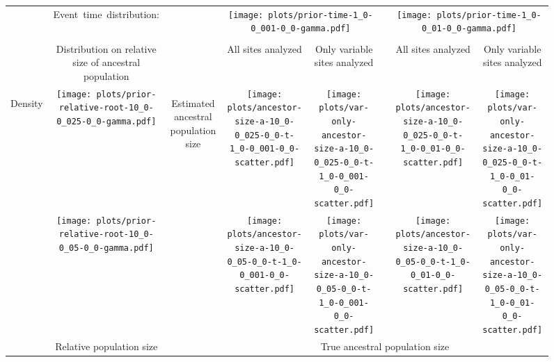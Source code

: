 \documentclass[border=10pt,varwidth=30cm]{standalone}
\begin{document}
\begin{figure}
    \centering
    \begin{tabular}{@{}cccccccc@{}}
        & \multirow{1}{0.15\textwidth}[8em]{\centering\Large Event~time~distribution:}
        &
        & \multicolumn{2}{c}{\texttt{[image: plots/prior-time-1\_0-0\_001-0\_0-gamma.pdf]}}
        &
        & \multicolumn{2}{c}{\texttt{[image: plots/prior-time-1\_0-0\_01-0\_0-gamma.pdf]}} \\
        \cline{1-2}\cline{4-5}\cline{7-8}
        & & & & & & & \\
        & \multirow{1}{0.15\textwidth}{\centering\Large Distribution on relative size of ancestral population}
        &
        & \multirow{1}{0.15\textwidth}{\centering\Large All sites analyzed}
        & \multirow{1}{0.15\textwidth}{\centering\Large Only variable sites analyzed}
        &
        & \multirow{1}{0.15\textwidth}{\centering\Large All sites analyzed}
        & \multirow{1}{0.15\textwidth}{\centering\Large Only variable sites analyzed} \\[9ex]
        \multirow{2}{*}[1em]{\begin{sideways}\large Density\end{sideways}}
        & \texttt{[image: plots/prior-relative-root-10\_0-0\_025-0\_0-gamma.pdf]}
        & \multirow{2}{*}[8em]{\begin{sideways}\large Estimated ancestral population size\end{sideways}}
        & \texttt{[image: plots/ancestor-size-a-10\_0-0\_025-0\_0-t-1\_0-0\_001-0\_0-scatter.pdf]}
        & \texttt{[image: plots/var-only-ancestor-size-a-10\_0-0\_025-0\_0-t-1\_0-0\_001-0\_0-scatter.pdf]}
        &
        & \texttt{[image: plots/ancestor-size-a-10\_0-0\_025-0\_0-t-1\_0-0\_01-0\_0-scatter.pdf]}
        & \texttt{[image: plots/var-only-ancestor-size-a-10\_0-0\_025-0\_0-t-1\_0-0\_01-0\_0-scatter.pdf]} \\
        & \texttt{[image: plots/prior-relative-root-10\_0-0\_05-0\_0-gamma.pdf]}
        &
        & \texttt{[image: plots/ancestor-size-a-10\_0-0\_05-0\_0-t-1\_0-0\_001-0\_0-scatter.pdf]}
        & \texttt{[image: plots/var-only-ancestor-size-a-10\_0-0\_05-0\_0-t-1\_0-0\_001-0\_0-scatter.pdf]}
        &
        & \texttt{[image: plots/ancestor-size-a-10\_0-0\_05-0\_0-t-1\_0-0\_01-0\_0-scatter.pdf]}
        & \texttt{[image: plots/var-only-ancestor-size-a-10\_0-0\_05-0\_0-t-1\_0-0\_01-0\_0-scatter.pdf]} \\
        & \multirow{1}{0.15\textwidth}{\centering\large Relative population size}
        &
        & \multicolumn{5}{c}{\large True ancestral population size} \\
    \end{tabular}
\end{figure}
\end{document}
